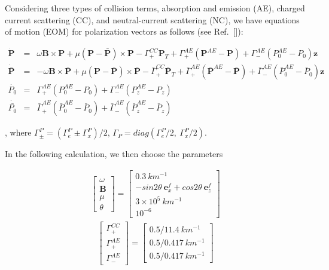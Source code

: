 \documentclass[aps,prd,twocolumn,amsmath,amssymb,groupedaddress]{revtex4-2}
\begin{document}
Considering three types of collision terms, absorption and emission (AE), charged current
scattering (CC), and neutral-current scattering (NC), we have equations of motion (EOM) for polarization vectors as follows (see Ref.~[\cite{2021arXiv210411369J}]):
\begin{widetext}
\begin{eqnarray} 
	\dot{\textbf{P}} &=& \omega \textbf{B} \times \textbf{P}+ \mu (\textbf{P}-\bar{\textbf{P}}) \times \textbf{P} - \Gamma^{CC}_+ \textbf{P}_T + \Gamma^{AE}_+ (\textbf{P}^{AE} - \textbf{P}) + \Gamma^{AE}_- (P^{AE}_0 -P_0)\textbf{z} \\
	\dot{\bar{\textbf{P}}} &=& -\omega \textbf{B} \times \bar{\textbf{P}}+ \mu (\textbf{P}-\bar{\textbf{P}}) \times \bar{\textbf{P}} - \bar{\Gamma}^{CC}_+ \bar{\textbf{P}}_T + \bar{\Gamma}^{AE}_+ (\bar{\textbf{P}}^{AE} - \bar{\textbf{P}}) + \bar{\Gamma}^{AE}_- (\bar{P}^{AE}_0 -\bar{P}_0)\textbf{z} \\
	\dot{P_0} &=& \Gamma^{AE}_+ (P^{AE}_0 -P_0) + \Gamma^{AE}_- (P^{AE}_z -P_z) \\
	\dot{\bar{P_0}} &=& \bar{\Gamma}^{AE}_+ (\bar{P}^{AE}_0 -\bar{P}_0) + \bar{\Gamma}^{AE}_- (\bar{P}^{AE}_z -\bar{P}_z)
\end{eqnarray}
\end{widetext}
, where  $\Gamma^{P}_\pm = \left(\Gamma^{P}_e \pm  \Gamma^{P}_x\right)/2$, $\Gamma_{P} = diag \left(\Gamma^{P}_e/2, ~\Gamma^{P}_x/2 \right)$.

In the following calculation, we then choose the parameters

\begin{eqnarray}
	\begin{bmatrix}
		\omega \\ 
		\textbf{B} \\ 
		\mu \\ 
		\theta
	\end{bmatrix}
	= \begin{bmatrix}
		0.3 ~km^{-1} \\ -sin 2\theta~\textbf{e}_x^f + cos 2\theta~\textbf{e}_z^f \\ 3 \times 10^5 ~km^{-1} \\ 10^{-6}
	\end{bmatrix}
\end{eqnarray}
\begin{eqnarray}
	\begin{bmatrix}
		\Gamma^{CC}_+ \\ \Gamma^{AE}_+ \\ \Gamma^{AE}_-
	\end{bmatrix}
	= \begin{bmatrix}
		0.5/11.4 ~km^{-1} \\ 0.5/0.417 ~km^{-1} \\ 0.5/0.417 ~km^{-1}
	\end{bmatrix}
\end{eqnarray}
\end{document}
